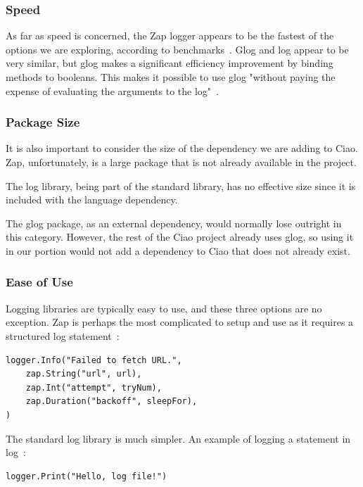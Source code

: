 \documentclass[10pt,letterpaper,onecolumn,journal]{IEEEtran}
\begin{document}
\subsubsection{Speed}

As far as speed is concerned, the Zap logger appears to be the fastest of the
options we are exploring, according to benchmarks~\cite{zap}. Glog and log
appear to be very similar, but glog makes a significant efficiency improvement
by binding methods to booleans. This makes it possible to use glog "without
paying the expense of evaluating the arguments to the log"~\cite{glog}.

\subsubsection{Package Size}

It is also important to consider the size of the dependency we are adding to
Ciao. Zap, unfortunately, is a large package that is not already available in
the project.

The log library, being part of the standard library, has no effective size since
it is included with the language dependency.

The glog package, as an external dependency, would normally lose outright in
this category. However, the rest of the Ciao project already uses glog, so
using it in our portion would not add a dependency to Ciao that does not already
exist.

\subsubsection{Ease of Use}

Logging libraries are typically easy to use, and these three options are no
exception. Zap is perhaps the most complicated to setup and use as it requires a
structured log statement~\cite{zap}:

\begin{lstlisting}
logger.Info("Failed to fetch URL.",
	zap.String("url", url),
	zap.Int("attempt", tryNum),
	zap.Duration("backoff", sleepFor),
)
\end{lstlisting}

The standard log library is much simpler. An example of logging a statement in
log~\cite{log}:

\begin{lstlisting}
logger.Print("Hello, log file!")
\end{lstlisting}
\end{document}
